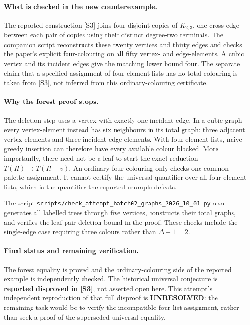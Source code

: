 \documentclass[11pt,a4paper]{article}
\begin{document}
\paragraph{What is checked in the new counterexample.}
The reported construction [S3] joins four disjoint copies of $K_{2,3}$, one cross edge between each pair of copies using their distinct degree-two terminals. The companion script reconstructs these twenty vertices and thirty edges and checks the paper's explicit four-colouring on all fifty vertex- and edge-elements. A cubic vertex and its incident edges give the matching lower bound four. The separate claim that a specified assignment of four-element lists has no total colouring is taken from [S3], not inferred from this ordinary-colouring certificate.

\paragraph{Why the forest proof stops.}
The deletion step uses a vertex with exactly one incident edge. In a cubic graph every vertex-element instead has six neighbours in its total graph: three adjacent vertex-elements and three incident edge-elements. With four-element lists, naive greedy insertion can therefore have every available colour blocked. More importantly, there need not be a leaf to start the exact reduction $T(H)\to T(H-v)$. An ordinary four-colouring only checks one common palette assignment. It cannot certify the universal quantifier over all four-element lists, which is the quantifier the reported example defeats.

The script \texttt{scripts/check\_attempt\_batch02\_graphs\_2026\_10\_01.py} also generates all labelled trees through five vertices, constructs their total graphs, and verifies the leaf-pair deletion bound in the proof. These checks include the single-edge case requiring three colours rather than $\Delta+1=2$.

\paragraph{Final status and remaining verification.}
The forest equality is proved and the ordinary-colouring side of the reported example is independently checked. The historical universal conjecture is \textbf{reported disproved in [S3]}, not asserted open here. This attempt's independent reproduction of that full disproof is \textbf{UNRESOLVED}: the remaining task would be to verify the incompatible four-list assignment, rather than seek a proof of the superseded universal equality.
\end{document}
